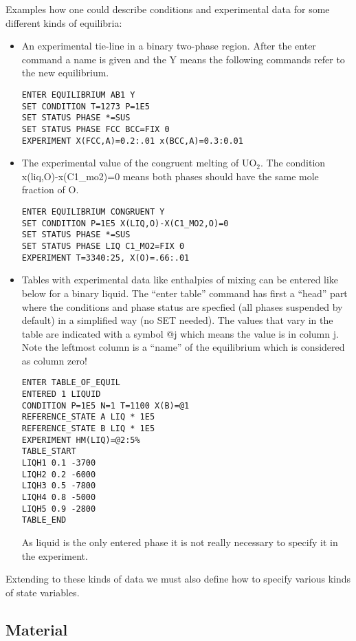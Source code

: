 \documentclass[12pt]{article}
\begin{document}
Examples how one could describe
conditions and experimental data for some different kinds of equilibria:
\begin{itemize}
\item An experimental tie-line in a binary two-phase region. After the
  enter command a name is given and the Y means the following commands
  refer to the new equilibrium.
\begin{verbatim}
ENTER EQUILIBRIUM AB1 Y
SET CONDITION T=1273 P=1E5
SET STATUS PHASE *=SUS
SET STATUS PHASE FCC BCC=FIX 0
EXPERIMENT X(FCC,A)=0.2:.01 x(BCC,A)=0.3:0.01
\end{verbatim}

\item The experimental value of the congruent melting of UO$_2$.  The
  condition x(liq,O)-x(C1\_mo2)=0 means both phases should have the
  same mole fraction of O.
\begin{verbatim}
ENTER EQUILIBRIUM CONGRUENT Y
SET CONDITION P=1E5 X(LIQ,O)-X(C1_MO2,O)=0
SET STATUS PHASE *=SUS
SET STATUS PHASE LIQ C1_MO2=FIX 0
EXPERIMENT T=3340:25, X(O)=.66:.01
\end{verbatim}

\item Tables with experimental data like enthalpies of mixing can be
  entered like below for a binary liquid.  The ``enter table'' command
  has first a ``head'' part where the conditions and phase status are
  specfied (all phases suspended by default) in a simplified way (no
  SET needed).  The values that vary in the table are indicated with a
  symbol @j which means the value is in column j.  Note the leftmost
  column is a ``name'' of the equilibrium which is considered as
  column zero!
\begin{verbatim}
ENTER TABLE_OF_EQUIL
ENTERED 1 LIQUID
CONDITION P=1E5 N=1 T=1100 X(B)=@1
REFERENCE_STATE A LIQ * 1E5
REFERENCE_STATE B LIQ * 1E5
EXPERIMENT HM(LIQ)=@2:5%
TABLE_START
LIQH1 0.1 -3700 
LIQH2 0.2 -6000
LIQH3 0.5 -7800 
LIQH4 0.8 -5000 
LIQH5 0.9 -2800 
TABLE_END
\end{verbatim}
As liquid is the only entered phase it is not really necessary to
specify it in the experiment.

\end{itemize}

Extending to these kinds of data we must also define how to specify
various kinds of state variables.

\subsection{Material}\label{sec:material}
\end{document}
